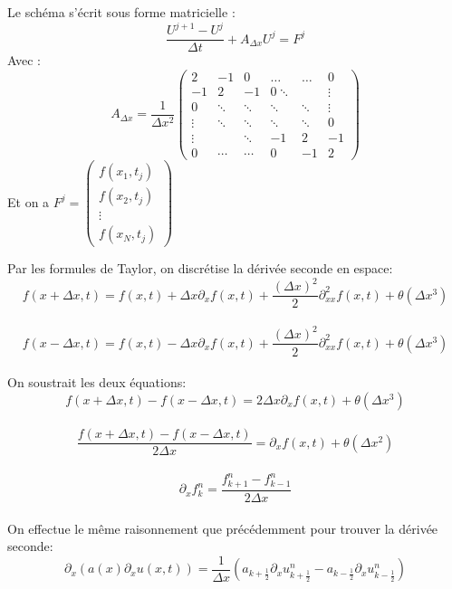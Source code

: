 \documentclass[a4paper,12pt,twoside]{report}
\begin{document}
Le schéma s'écrit sous forme matricielle :
\begin{equation}
\frac{U^{j+1}-U^j}{\Delta t} + A_{\Delta x}U^j = F^j
\end{equation}
Avec :
\begin{equation}
A_{\Delta x} = \frac{1}{\Delta x^2}
\begin{pmatrix}
   2 & -1 & 0 & \ldots & \ldots & 0\\
   -1 & 2 & -1 & 0 \ddots & & \vdots \\
   0 & \ddots & \ddots & \ddots & \ddots & \vdots\\
   \vdots & \ddots & \ddots & \ddots &\ddots & 0\\
   \vdots & & \ddots & -1 & 2 & -1\\
   0 & \cdots & \cdots & 0 & -1 & 2
\end{pmatrix}
\end{equation}
Et on a $F^j = \left( \begin{array}{c}
f(x_1,t_j)\\
f(x_2,t_j) \\
\vdots \\
f(x_N,t_j)
\end{array} \right)$


\smallbreak
Par les formules de Taylor, on discrétise la dérivée seconde en espace:\\
$$f(x + \Delta x, t) = f(x,t) + \Delta x \partial_x f(x,t) + \frac{(\Delta x)^2}{2} \partial_{xx} ^2 f(x,t) + \theta (\Delta x^3) $$ \\

$$f(x - \Delta x, t) = f(x,t) - \Delta x \partial_x f(x,t) + \frac{(\Delta x)^2}{2} \partial_{xx} ^2 f(x,t) + \theta (\Delta x^3) $$ \\
On soustrait les deux équations: \\

$$f(x + \Delta x, t) -f(x - \Delta x, t) = 2 \Delta x \partial_x f(x,t) + \theta (\Delta x^3) $$ \\
$$\frac{f(x + \Delta x, t) -f(x - \Delta x, t)}{2 \Delta x} = \partial_x f(x,t) + \theta (\Delta x^2)$$ \\
$$\partial_x f_k ^n = \frac{f_{k+1} ^n - f_{k-1} ^n}{2 \Delta x}$$ \\


On effectue le même raisonnement que précédemment pour trouver la dérivée seconde:\\
$$ \partial_x(a(x) \partial_x u(x,t)) = \frac{1}{ \Delta x}(a_{k+\frac{1}{2}} \partial_x u_{k+\frac{1}{2}} ^n - a_{k-\frac{1}{2}} \partial_x u_{k-\frac{1}{2}} ^n) $$\\
\end{document}
